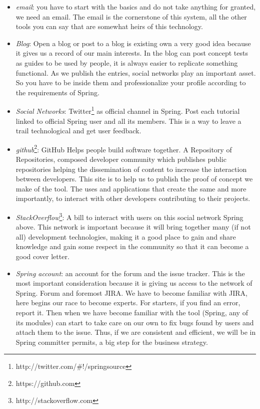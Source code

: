 \documentclass[11pt]{scrartcl}
\begin{document}
\begin{itemize}
    \item \emph{email}: you have to start with the basics and do not take anything for granted, we need an email. The email is the cornerstone of this system, all the other tools you can say that are somewhat heirs of this technology.
    \item \emph{Blog}: Open a blog or post to a blog is existing own a very good idea because it gives us a record of our main interests. In the blog can post concept tests as guides to be used by people, it is always easier to replicate something functional. As we publish the entries, social networks play an important asset. So you have to be inside them and professionalize your profile according to the requirements of Spring.
    \item \emph{Social Networks}: Twitter\footnote{http://twitter.com/\#!/springsource} as official channel in Spring. Post each tutorial linked to official Spring user and all its members. This is a way to leave a trail technological and get user feedback.
    \item \emph{github}\footnote{https://github.com}: GitHub Helps people build software together. A Repository of Repositories, composed developer community which publishes public repositories helping the dissemination of content to increase the interaction between developers. This site is to help us to publish the proof of concept we make of the tool. The uses and applications that create the same and more importantly, to interact with other developers contributing to their projects.
    \item \emph{StackOverflow}\footnote{http://stackoverflow.com}: A bill to interact with users on this social network Spring above. This network is important because it will bring together many (if not all) development technologies, making it a good place to gain and share knowledge and gain some respect in the community so that it can become a good cover letter.
    \item \emph{Spring account}: an account for the forum and the issue tracker. This is the most important consideration because it is giving us access to the network of Spring. Forum and foremost JIRA. We have to become familiar with JIRA, here begins our race to become experts. For starters, if you find an error, report it. Then when we have become familiar with the tool (Spring, any of its modules) can start to take care on our own to fix bugs found by users and attach them to the issue. Thus, if we are consistent and efficient, we will be in Spring committer permits, a big step for the business strategy.
\end{itemize}
\end{document}
